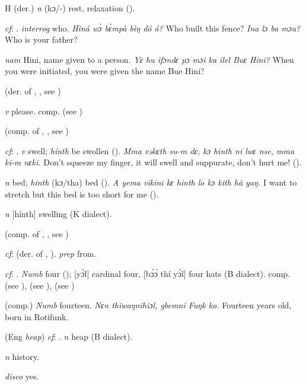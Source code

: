 \begin{letter}{H}
 (der.) \textit{n} (kɔ/-) rest, relaxation (\citealt{Pichl1967}).

 \textit{cf}: . \textit{interrog} who. \textit{Hìná wɔ̀ bɛ̀mpà bìŋ dó á?} Who built this fence? \textit{Ina lɔ ba mɔa?} Who is your father?

 \textit{nam} Hini, name given to a person. \textit{Yɛ hu ifɔndɛ pɔ mɔi ka ilel Buɛ Hini?} When you were initiated, you were given the name Bue Hini?

 (der. of , , see ) 

 \textit{v} please. comp.  (see ) 

 (comp. of , , see ) 

 \textit{cf}: . \textit{v} swell; \textit{hínth} be swollen (\citealt{Sumner1921}). \textit{Mma vəkɛth su-m dɛ, kɔ hinth ni lwɛ nse, mma ki-m nɛki.} Don't squeeze my finger, it will swell and suppurate, don't hurt me! (\citealt{Pichl1967}). 

 \textit{n} bed; \textit{hinth} (kɔ/tha) bed (\citealt{Pichl1967}). \textit{A yema vikini kɛ hinth lo kɔ kith hã yaŋ.} I want to stretch but this bed is too short for me (\citealt{Pichl1967}). 

 \textit{n} [hínth] swelling (K dialect). 

 (comp. of , , see ) 

 \textit{cf}:  (der. of , ). \textit{prep} from.

 \textit{cf}: . \textit{Numb} four (\citealt{Sumner1921}); [yɔ̀l] cardinal four, [bɔ́ɔ́ thí yɔ̀l] four hats (B dialect). comp.  (see ),  (see ),  (see )

 (comp.) \textit{Numb} fourteen. \textit{Nɛn thiwaŋnihiɔl, gbemni Fuŋk ko.} Fourteen years old, born in Rotifunk.

 (Eng \textit{heap}) \textit{cf}: . \textit{n} heap (B dialect).

 \textit{n} history.

 \textit{disco} yes.


\end{letter}
